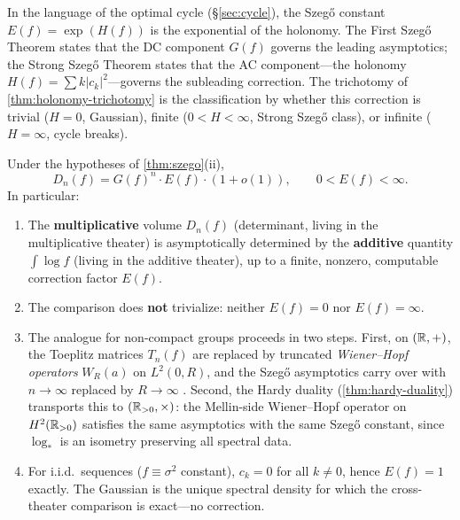 \begin{remark}
In the language of the optimal cycle (\S\ref{sec:cycle}), the Szeg\H{o} constant $E(f) = \exp(H(f))$ is the exponential of the holonomy. The First Szeg\H{o} Theorem states that the DC component $G(f)$ governs the leading asymptotics; the Strong Szeg\H{o} Theorem states that the AC component---the holonomy $H(f) = \sum k|c_k|^2$---governs the subleading correction. The trichotomy of \cref{thm:holonomy-trichotomy} is the classification by whether this correction is trivial ($H = 0$, Gaussian), finite ($0 < H < \infty$, Strong Szeg\H{o} class), or infinite ($H = \infty$, cycle breaks).
\end{remark}

\begin{corollary}\label{cor:nontrivial-volume}
Under the hypotheses of \cref{thm:szego}(ii),
\[
D_n(f) = G(f)^n \cdot E(f) \cdot (1 + o(1)), \qquad 0 < E(f) < \infty.
\]
In particular:
\begin{enumerate}[label=(\roman*)]
\item The \textbf{multiplicative} volume $D_n(f)$ (determinant, living in the multiplicative theater) is asymptotically determined by the \textbf{additive} quantity $\int \log f$ (living in the additive theater), up to a finite, nonzero, computable correction factor $E(f)$.
\item The comparison does \textbf{not} trivialize: neither $E(f) = 0$ nor $E(f) = \infty$.
\item The analogue for non-compact groups proceeds in two steps. First, on $(\mathbb{R}, +)$, the Toeplitz matrices $T_n(f)$ are replaced by truncated \emph{Wiener--Hopf operators} $W_R(a)$ on $L^2(0, R)$, and the Szeg\H{o} asymptotics carry over with $n \to \infty$ replaced by $R \to \infty$ \cite[Chapter~10]{BottcherSilbermann}. Second, the Hardy duality (\cref{thm:hardy-duality}) transports this to $(\mathbb{R}_{>0}, \times)$: the Mellin-side Wiener--Hopf operator on $H^2(\mathbb{R}_{>0})$ satisfies the same asymptotics with the same Szeg\H{o} constant, since $\log_*$ is an isometry preserving all spectral data.
\item For i.i.d.\ sequences ($f \equiv \sigma^2$ constant), $c_k = 0$ for all $k \neq 0$, hence $E(f) = 1$ exactly. The Gaussian is the unique spectral density for which the cross-theater comparison is exact---no correction.
\end{enumerate}
\end{corollary}

